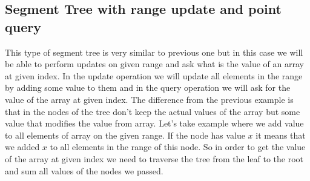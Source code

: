 \documentclass{article}
\begin{document}
\subsection{Segment Tree with range update and point query}
This type of segment tree is very similar to previous one but in this case we will be able
to perform updates on given range and ask what is the value of an array at given index.
In the update operation we will update all elements in the range by adding some value to them
and in the query operation we will ask for the value of the array at given index.
The difference from the previous example is that in the nodes of the tree don't keep the
actual values of the array but some value that modifies the value from array. 
Let's take example where we add value to all elements of array on the given range. 
If the node has value $x$ it means that we added $x$ to all elements in the range of this node.
So in order to get the value of the array at given index we need to traverse the tree 
from the leaf to the root and sum all values of the nodes we passed.
\end{document}
